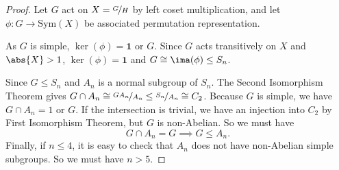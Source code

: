 \begin{proof}
    Let \(G\) act on \(X = \nicefrac{G}{H}\) by left coset multiplication, and let \(\phi:G \to \mathrm{Sym}(X)\) be associated permutation representation.

    As \(G\) is simple, \(\ker(\phi)=\mathbf{1} \text{ or } G\). Since \(G\) acts transitively on \(X\) and \(\abs{X} >1\), \(\ker(\phi) = \textbf{1} \) and \(G \cong \ima(\phi)\leq S_n\).

    Since \(G \leq S_n\) and \(A_n\) is a normal subgroup of \(S_n\). The Second Isomorphism Theorem gives \( G\cap A_n\cong \nicefrac{GA_n}{A_n} \leq \nicefrac{S_n}{A_n} \cong C_2 \). Because \(G\) is simple, we have \(G\cap A_{n} = 1 \text{ or } G\). If the intersection is trivial, we have an injection into \(C_2\) by First Isomorphism Theorem, but \(G\) is non-Abelian. So we must have
    \[
        G\cap A_n = G \implies G \leq A_n.
    \]
    Finally, if \(n\leq 4\), it is easy to check that \(A_n\) does not have non-Abelian simple subgroups. So we must have \(n > 5\).
\end{proof}